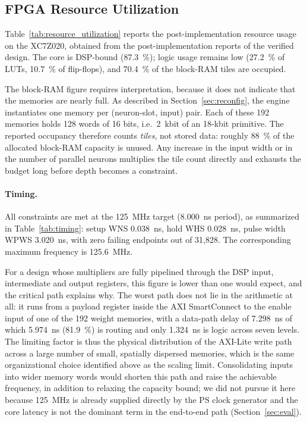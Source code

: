 \documentclass[final,5p,times,twocolumn]{elsarticle}
\begin{document}
\subsection{FPGA Resource Utilization}
Table~\ref{tab:resource_utilization} reports the post-implementation resource
usage on the XC7Z020, obtained from the post-implementation reports of the
verified design. The core is DSP-bound (\SI{87.3}{\percent}); logic usage
remains low (\SI{27.2}{\percent} of LUTs, \SI{10.7}{\percent} of flip-flops),
and \SI{70.4}{\percent} of the block-RAM tiles are occupied.

The block-RAM figure requires interpretation, because it does not indicate that
the memories are nearly full. As described in Section~\ref{sec:reconfig}, the
engine instantiates one memory per (neuron-slot, input) pair. Each of these 192
memories holds 128 words of 16 bits, i.e.\ \SI{2}{kbit} of an 18-kbit primitive.
The reported occupancy therefore counts \emph{tiles}, not stored data: roughly
\SI{88}{\percent} of the allocated block-RAM capacity is unused. Any increase in
the input width or in the number of parallel neurons multiplies the tile count
directly and exhausts the budget long before depth becomes a constraint.

\paragraph{Timing.}
All constraints are met at the \SI{125}{\mega\hertz} target
(\SI{8.000}{\nano\second} period), as summarized in Table~\ref{tab:timing}:
setup WNS \SI{0.038}{\nano\second}, hold WHS \SI{0.028}{\nano\second}, pulse
width WPWS \SI{3.020}{\nano\second}, with zero failing endpoints out of
31{,}828. The corresponding maximum frequency is \SI{125.6}{\mega\hertz}.

For a design whose multipliers are fully pipelined through the DSP input,
intermediate and output registers, this figure is lower than one would expect,
and the critical path explains why. The worst path does not lie in the
arithmetic at all: it runs from a payload register inside the AXI SmartConnect
to the enable input of one of the 192 weight memories, with a data-path delay of
\SI{7.298}{\nano\second} of which \SI{5.974}{\nano\second}
(\SI{81.9}{\percent}) is routing and only \SI{1.324}{\nano\second} is logic
across seven levels. The limiting factor is thus the physical distribution of
the AXI-Lite write path across a large number of small, spatially dispersed
memories, which is the same organizational choice identified above as the
scaling limit. Consolidating inputs into wider memory words would shorten this path and
raise the achievable frequency, in addition to relaxing the capacity bound; we
did not pursue it here because \SI{125}{\mega\hertz} is already supplied
directly by the PS clock generator and the core latency is not the dominant
term in the end-to-end path (Section~\ref{sec:eval}).
\end{document}
